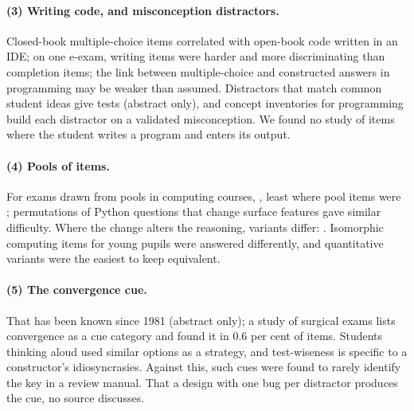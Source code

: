 \paragraph{(3) Writing code, and misconception distractors.}
Closed-book multiple-choice items correlated
 with
open-book code written in an IDE; on one e-exam, writing items were
harder and more discriminating than completion items;\autocite{Sindre2020}
the link between multiple-choice and constructed answers in programming
may be weaker than assumed.\autocite{Kuechler2010}  Distractors that match
common student ideas give tests  (abstract only), and concept inventories
for programming build each distractor on a validated
misconception.\autocite{Caceffo2016}  We found no study of items where the
student writes a program and enters its output.

\paragraph{(4) Pools of items.}
For exams drawn from pools in computing courses,
, least where pool
items were ; permutations of Python questions that change surface
features gave similar difficulty.\autocite{FowlerZilles2021}  Where the
change alters the reasoning, variants differ:
.
Isomorphic computing items for young pupils were answered
differently,\autocite{Parker2022} and quantitative variants were the
easiest to keep equivalent.\autocite{GoolsbyCole2023}

\paragraph{(5) The convergence cue.}
That  has been known since 1981 (abstract only); a study of
surgical exams lists convergence as a cue category and found it in 0.6 per
cent of items.\autocite{deLaffolie2017}  Students thinking aloud used
similar options as a strategy,\autocite{TownsRobinson1993} and
test-wiseness is specific to a constructor's
idiosyncrasies.\autocite{Evans1984}  Against this, such cues were found
to rarely identify the key in a review manual.\autocite{Gettig2006}  That
a design with one bug per distractor produces the cue, no source
discusses.

